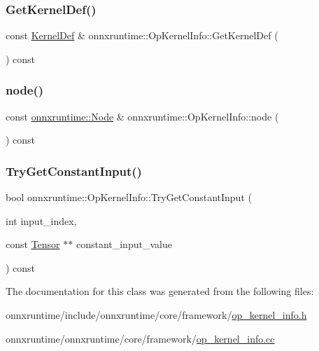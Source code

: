 \subsubsection{\texorpdfstring{Get\+Kernel\+Def()}{GetKernelDef()}}
{\footnotesize\ttfamily const \mbox{\hyperlink{classonnxruntime_1_1KernelDef}{Kernel\+Def}} \& onnxruntime\+::\+Op\+Kernel\+Info\+::\+Get\+Kernel\+Def (\begin{DoxyParamCaption}{ }\end{DoxyParamCaption}) const}

\mbox{\label{classonnxruntime_1_1OpKernelInfo_add4a38936cf8fc4f2f1c44eb8faaf75a}} 
\subsubsection{\texorpdfstring{node()}{node()}}
{\footnotesize\ttfamily const \mbox{\hyperlink{classonnxruntime_1_1Node}{onnxruntime\+::\+Node}} \& onnxruntime\+::\+Op\+Kernel\+Info\+::node (\begin{DoxyParamCaption}{ }\end{DoxyParamCaption}) const\hspace{0.3cm}{\ttfamily [noexcept]}}

\mbox{\label{classonnxruntime_1_1OpKernelInfo_a7ae4c84bc281ec439f36966f37345ab8}} 
\subsubsection{\texorpdfstring{Try\+Get\+Constant\+Input()}{TryGetConstantInput()}}
{\footnotesize\ttfamily bool onnxruntime\+::\+Op\+Kernel\+Info\+::\+Try\+Get\+Constant\+Input (\begin{DoxyParamCaption}\item[{int}]{input\+\_\+index,  }\item[{const \mbox{\hyperlink{classonnxruntime_1_1Tensor}{Tensor}} $\ast$$\ast$}]{constant\+\_\+input\+\_\+value }\end{DoxyParamCaption}) const}



The documentation for this class was generated from the following files\+:\begin{DoxyCompactItemize}
\item 
onnxruntime/include/onnxruntime/core/framework/\mbox{\hyperlink{op__kernel__info_8h}{op\+\_\+kernel\+\_\+info.\+h}}\item 
onnxruntime/onnxruntime/core/framework/\mbox{\hyperlink{op__kernel__info_8cc}{op\+\_\+kernel\+\_\+info.\+cc}}\end{DoxyCompactItemize}
